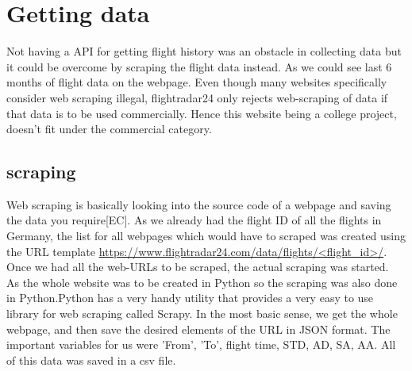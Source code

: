 \section{Getting data}
Not having a API for getting flight history was an obstacle in collecting data but it could be overcome by scraping the flight data instead. As we could see last 6 months of flight data on the webpage.
Even though many websites specifically consider web scraping illegal, flightradar24 only rejects web-scraping of data if that data is to be used commercially. Hence this website being a college project, doesn't fit under the commercial category.

\subsection{scraping}
Web scraping is basically looking into the source code of a webpage and saving the data you require[EC]. As we already had the flight ID of all the flights in Germany, the list for all webpages which would have to scraped was created using the URL template \url{https://www.flightradar24.com/data/flights/<flight_id>/}. 
Once we had all the web-URLs to be scraped, the actual scraping was started. \\As the whole website was to be created in Python so  the scraping was also done in Python.Python has a very handy utility that provides a very easy to use library for web scraping called Scrapy. 
In the most basic sense, we get the whole webpage, and then save the desired elements of the URL in JSON format. The important variables for us were 'From', 'To', flight time, STD, AD, SA, AA. All of this data was saved in a csv file.
 

